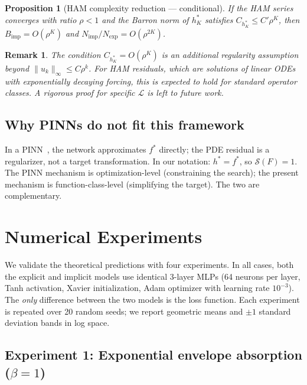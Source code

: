\documentclass[12pt]{article}
\newtheorem{proposition}[theorem]{Proposition}
\newtheorem{remark}{Remark}
\begin{document}
\begin{proposition}[HAM complexity reduction --- conditional]
\label{prop:HAM}
If the HAM series converges with ratio $\rho < 1$ and
the Barron norm of $h^*_K$ satisfies
$C_{h^*_K} \le C' \rho^K$, then
$B_{\mathrm{imp}} = O(\rho^K)$ and
$N_{\mathrm{imp}}/N_{\mathrm{exp}} = O(\rho^{2K})$.
\end{proposition}

\begin{remark}
The condition $C_{h^*_K} = O(\rho^K)$ is an additional regularity
assumption beyond $\|u_k\|_\infty \le C\rho^k$.
For HAM residuals, which are solutions of linear ODEs with
exponentially decaying forcing, this is expected to hold
for standard operator classes.
A rigorous proof for specific $\mathcal{L}$ is left to future work.
\end{remark}

\subsection{Why PINNs do not fit this framework}
\label{sec:why_not_pinns}

In a PINN~\cite{Raissi2019}, the network approximates $f^*$
directly; the PDE residual is a regularizer, not a target
transformation.
In our notation: $h^* = f^*$, so $\mathcal{S}(F) = 1$.
The PINN mechanism is optimization-level (constraining the search);
the present mechanism is function-class-level (simplifying the
target).
The two are complementary.

\section{Numerical Experiments}
\label{sec:experiments}

We validate the theoretical predictions with four experiments.
In all cases, both the explicit and implicit models use identical
3-layer MLPs (64 neurons per layer, Tanh activation, Xavier
initialization, Adam optimizer with learning rate $10^{-3}$).
The \emph{only} difference between the two models is the loss
function.
Each experiment is repeated over 20 random seeds; we report
geometric means and $\pm 1$ standard deviation bands in log space.

\subsection{Experiment 1: Exponential envelope absorption ($\beta = 1$)}
\end{document}
